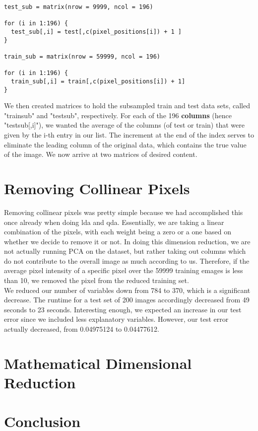 \documentclass[10pt]{extarticle}
\begin{document}
\begin{verbatim}
test_sub = matrix(nrow = 9999, ncol = 196)

for (i in 1:196) {
  test_sub[,i] = test[,c(pixel_positions[i]) + 1 ]
}

train_sub = matrix(nrow = 59999, ncol = 196)

for (i in 1:196) {
  train_sub[,i] = train[,c(pixel_positions[i]) + 1]
}
\end{verbatim}

We then created matrices to hold the subsampled train and test data sets, called "train\textunderscore sub" and "test\textunderscore sub", respectively. For each of the 196 \textbf{columns} (hence "test\textunderscore sub[,i]"), we wanted the average of the columns (of test or train) that were given by the i-th entry in our list. The increment at the end of the index serves to eliminate the leading column of the original data, which contains the true value of the image. We now arrive at two matrices of desired content. 


\section{Removing Collinear Pixels}
\blank

Removing collinear pixels was pretty simple because we had accomplished this once already when doing lda and qda. Essentially, we are taking a linear combination of the pixels, with each weight being a zero or a one based on whether we decide to remove it or not. In doing this dimension reduction, we are not actually running PCA on the dataset, but rather taking out columns which do not contribute to the overall image as much according to us. Therefore, if the average pixel intensity of a specific pixel over the 59999 training emages is less than 10, we removed the pixel from the reduced training set.\\

We reduced our number of variables down from 784 to 370, which is a significant decrease. The runtime for a test set of 200 images accordingly decreased from 49 seconds to 23 seconds. Interesting enough, we expected an increase in our test error since we included less explanatory variables. However, our test error actually decreased, from 0.04975124 to 0.04477612.

\section{Mathematical Dimensional Reduction}
\blank


\section{Conclusion}
\blank 
\end{document}
